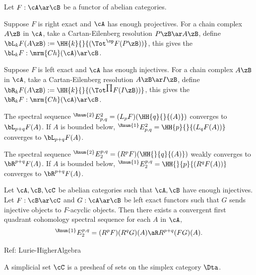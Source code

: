 \documentclass[a4paper, twoside]{article}
\begin{document}
\begin{dfn}[5.7.4, 5.7.9]
    Let $F:\cA\ar\cB$ be a functor of abelian categories.

    \begin{itm}
        \item Suppose $F$ is right exact and $\cA$ has enough projectives. For a chain complex $A\zB$ in $\cA$, take a Cartan-Eilenberg resolution $P\zB\ar A\zB$, define $\bL_{k}F(A\zB):=\HH{k}{}{(\Tot^{\op}F(P\zB))}$, this gives the  $\bL_{k}F:\mrm{Ch}(\cA)\ar\cB$.
        \item Suppose $F$ is left exact and $\cA$ has enough injectives. For a chain complex $A\zB$ in $\cA$, take a Cartan-Eilenberg resolution $A\zB\ar I\zB$, define $\bR_{k}F(A\zB):=\HH{k}{}{(\Tot^{\prod}F(I\zB))}$, this gives the  $\bR_{k}F:\mrm{Ch}(\cA)\ar\cB$.
    \end{itm}

\end{dfn}

\begin{thm}[5.7.6, 5.7.9]
    The spectral sequence ${}^{\Rnum{2}}E_{p,q}^{2}=(L_{p}F)(\HH{q}{}{(A)})$ converges to $\bL_{p+q}F(A)$. If $A$ is bounded below, ${}^{\Rnum{1}}E_{p,q}^{2}=\HH{p}{}{(L_{q}F(A))}$ converges to $\bL_{p+q}F(A)$.

    The spectral sequence ${}^{\Rnum{2}}E_{2}^{p,q}=(R^{p}F)(\HH{}{q}{(A)})$ weakly converges to $\bR^{p+q}F(A)$. If $A$ is bounded below, ${}^{\Rnum{1}}E_{2}^{p,q}=\HH{}{p}{(R^{q}F(A))}$ converges to $\bR^{p+q}F(A)$.
\end{thm}

\begin{thm}[Grothendieck, 5.8.3]
    Let $\cA,\cB,\cC$ be abelian categories such that $\cA,\cB$ have enough injectives. Let $F:\cB\ar\cC$ and $G:\cA\ar\cB$ be left exact functors such that $G$ sends injective objects to $F$-acyclic objects. Then there exists a convergent first quadrant cohomology spectral sequence for each $A$ in $\cA$,
    \[
        {}^{\Rnum{1}}E_{2}^{p,q}=(R^{p}F)(R^{q}G)(A)\aR R^{p+q}(FG)(A).
    \]
\end{thm}

Ref: Lurie-HigherAlgebra


\begin{dfn}
    A simplicial set $\cC$ is a presheaf of sets on the simplex category $\Dta$.
\end{dfn}
\end{document}
